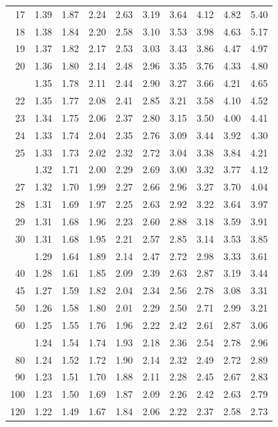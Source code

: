 \documentclass[10pt]{article}
\begin{document}
\begin{longtable}{@{}r!{\vrule width 0.8pt\hspace{0.55em}}rrrrrrrrr@{}}
17 & 1.39 & 1.87 & 2.24 & 2.63 & 3.19 & 3.64 & 4.12 & 4.82 & 5.40 \\
18 & 1.38 & 1.84 & 2.20 & 2.58 & 3.10 & 3.53 & 3.98 & 4.63 & 5.17 \\
19 & 1.37 & 1.82 & 2.17 & 2.53 & 3.03 & 3.43 & 3.86 & 4.47 & 4.97 \\
20 & 1.36 & 1.80 & 2.14 & 2.48 & 2.96 & 3.35 & 3.76 & 4.33 & 4.80 \\
 & 1.35 & 1.78 & 2.11 & 2.44 & 2.90 & 3.27 & 3.66 & 4.21 & 4.65 \\
22 & 1.35 & 1.77 & 2.08 & 2.41 & 2.85 & 3.21 & 3.58 & 4.10 & 4.52 \\
23 & 1.34 & 1.75 & 2.06 & 2.37 & 2.80 & 3.15 & 3.50 & 4.00 & 4.41 \\
24 & 1.33 & 1.74 & 2.04 & 2.35 & 2.76 & 3.09 & 3.44 & 3.92 & 4.30 \\
25 & 1.33 & 1.73 & 2.02 & 2.32 & 2.72 & 3.04 & 3.38 & 3.84 & 4.21 \\
 & 1.32 & 1.71 & 2.00 & 2.29 & 2.69 & 3.00 & 3.32 & 3.77 & 4.12 \\
27 & 1.32 & 1.70 & 1.99 & 2.27 & 2.66 & 2.96 & 3.27 & 3.70 & 4.04 \\
28 & 1.31 & 1.69 & 1.97 & 2.25 & 2.63 & 2.92 & 3.22 & 3.64 & 3.97 \\
29 & 1.31 & 1.68 & 1.96 & 2.23 & 2.60 & 2.88 & 3.18 & 3.59 & 3.91 \\
30 & 1.31 & 1.68 & 1.95 & 2.21 & 2.57 & 2.85 & 3.14 & 3.53 & 3.85 \\
 & 1.29 & 1.64 & 1.89 & 2.14 & 2.47 & 2.72 & 2.98 & 3.33 & 3.61 \\
40 & 1.28 & 1.61 & 1.85 & 2.09 & 2.39 & 2.63 & 2.87 & 3.19 & 3.44 \\
45 & 1.27 & 1.59 & 1.82 & 2.04 & 2.34 & 2.56 & 2.78 & 3.08 & 3.31 \\
50 & 1.26 & 1.58 & 1.80 & 2.01 & 2.29 & 2.50 & 2.71 & 2.99 & 3.21 \\
60 & 1.25 & 1.55 & 1.76 & 1.96 & 2.22 & 2.42 & 2.61 & 2.87 & 3.06 \\
 & 1.24 & 1.54 & 1.74 & 1.93 & 2.18 & 2.36 & 2.54 & 2.78 & 2.96 \\
80 & 1.24 & 1.52 & 1.72 & 1.90 & 2.14 & 2.32 & 2.49 & 2.72 & 2.89 \\
90 & 1.23 & 1.51 & 1.70 & 1.88 & 2.11 & 2.28 & 2.45 & 2.67 & 2.83 \\
100 & 1.23 & 1.50 & 1.69 & 1.87 & 2.09 & 2.26 & 2.42 & 2.63 & 2.79 \\
120 & 1.22 & 1.49 & 1.67 & 1.84 & 2.06 & 2.22 & 2.37 & 2.58 & 2.73 \\

\end{longtable}
\end{document}
